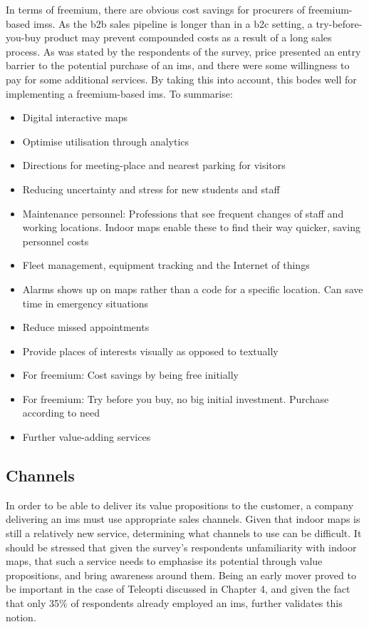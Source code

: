 In terms of freemium, there are obvious cost savings for procurers of freemium-based \glspl{ims}. As the \gls{b2b} sales pipeline is longer than in a \gls{b2c} setting, a try-before-you-buy product may prevent compounded costs as a result of a long sales process. As was stated by the respondents of the survey, price presented an entry barrier to the potential purchase of an \gls{ims}, and there were some willingness to pay for some additional services. By taking this into account, this bodes well for implementing a freemium-based \gls{ims}.
To summarise:

\begin{itemize}
    \item Digital interactive maps
    \item Optimise utilisation through analytics
    \item Directions for meeting-place and nearest parking for visitors
    \item Reducing uncertainty and stress for new students and staff
    \item Maintenance personnel: Professions that see frequent changes of staff and working locations. Indoor maps enable these to find their way quicker, saving personnel costs
    \item Fleet management, equipment tracking and the Internet of things
    \item Alarms shows up on maps rather than a code for a specific location. Can save time in emergency situations
    \item Reduce missed appointments
    \item Provide places of interests visually as opposed to textually
    \item For freemium: Cost savings by being free initially
    \item For freemium: Try before you buy, no big initial investment. Purchase according to need
    \item Further value-adding services
\end{itemize}

\subsection{Channels}
In order to be able to deliver its value propositions to the customer, a company delivering an \gls{ims} must use appropriate sales channels. Given that indoor maps is still a relatively new service, determining what channels to use can be difficult. It should be stressed that given the survey's respondents unfamiliarity with indoor maps, that such a service needs to emphasise its potential through value propositions, and bring awareness around them. Being an early mover proved to be important in the case of Teleopti discussed in Chapter 4, and given the fact that only 35\% of respondents already employed an \gls{ims}, further validates this notion. 


